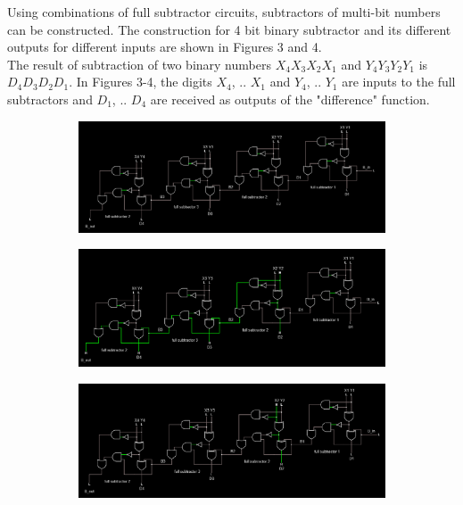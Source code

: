 \documentclass{article}
\begin{document}
	Using combinations of full subtractor circuits, subtractors of multi-bit numbers can be constructed. The construction for 4 bit binary subtractor and its different outputs for different inputs are shown in Figures 3 and 4.\\

	The result of subtraction of two binary numbers $X_4X_3X_2X_1$ and $Y_4Y_3Y_2Y_1$ is $D_4D_3D_2D_1$. In Figures 3-4, the digits $X_4$, .. $X_1$ and $Y_4$, .. $Y_1$ are inputs to the full subtractors and $D_1$, .. $D_4$ are received as outputs of the "difference" function.
	\begin{figure}[H]
		\centering
		\begin{subfigure}[t]{0.8\textwidth}
			\centering
			\includegraphics[width=\textwidth]{4bit/4bit_000.png}
		\end{subfigure}
		
		\begin{subfigure}[b]{0.8\textwidth}
			\centering
			\includegraphics[width=\textwidth]{4bit/4bit_010.png}
		\end{subfigure}
		
		\begin{subfigure}[b]{0.8\textwidth}
			\centering
			\includegraphics[width=\textwidth]{4bit/4bit_100.png}
		\end{subfigure}
		

\end{figure}
\end{document}
